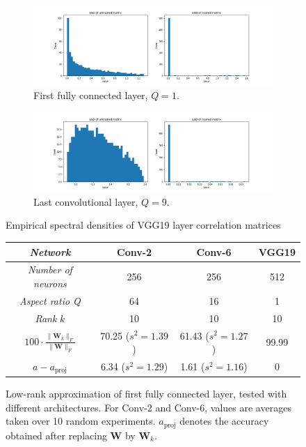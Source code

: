 \begin{figure}[H]
\centering
\begin{subfigure}[b]{\textwidth}
   \includegraphics[width=1\linewidth]{images/vgg-fc1-svd-comp.png}
   \caption{First fully connected layer, $Q = 1$.}
   \label{fig:vgg-conv16-svd-comp}
\end{subfigure}

\begin{subfigure}[b]{\textwidth}
   \includegraphics[width=1\linewidth]{images/vgg-conv16-svd-comp.png}
   \caption{Last convolutional layer, $Q = 9$.}
   \label{fig:vgg-conv16-svd-comp} 
\end{subfigure}
\caption{Empirical spectral densities of VGG19 layer correlation matrices}
\end{figure}

\begin{figure}[h]
\centering
\scalebox{0.9}
{\begin{tabular}{SSSS} \toprule
    {\textit{Network}} & {Conv-2} & {Conv-6} & {VGG19} \\ \midrule
	{\textit{Number of neurons}} & {256} & {256} & {512} \\    
    {\textit{Aspect ratio Q}} & {64} & {16} & {1} \\
    {\textit{Rank} $k$} & {10} & {10} & {10} \\
    {$100 \cdot \frac{ \| \mathbf{W}_k \|_F }{ \| \mathbf{W} \|_F }$}  & {70.25 ($s^2 = 1.39$)} & {61.43  ($s^2 = 1.27$)} & {99.99} \\
    {$a - a_{\text{proj}}$}  & {6.34 ($s^2 = 1.29$)} & {1.61  ($s^2 = 1.16$)} & {0} \\ \bottomrule
\end{tabular}}
\caption{Low-rank approximation of first fully connected layer, tested with different architectures. For Conv-2 and Conv-6, values are averages taken over 10 random experiments. $a_{\text{proj}}$ denotes the accuracy obtained after replacing $\mathbf{W}$ by $\mathbf{W}_k$.}
\label{fig:low-rank}
\end{figure}

